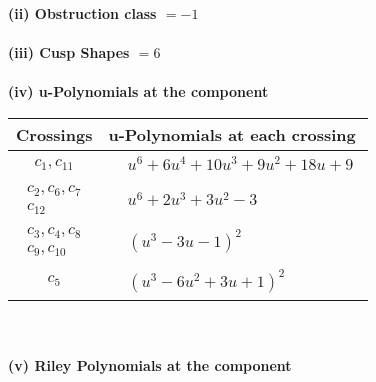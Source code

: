 \documentclass[1p]{elsarticle_modified}
\theoremstyle{definition}
\begin{document}
\flushleft \textbf{(ii) Obstruction class $= -1$}\\~\\
\flushleft \textbf{(iii) Cusp Shapes $= 6$}\\~\\
\newpage\renewcommand{\arraystretch}{1}
\flushleft \textbf{(iv) u-Polynomials at the component}\newline \\
\begin{tabular}{m{50pt}|m{274pt}}
Crossings & \hspace{64pt}u-Polynomials at each crossing \\
\hline $$\begin{aligned}c_{1},c_{11}\end{aligned}$$&$\begin{aligned}
&u^6+6 u^4+10 u^3+9 u^2+18 u+9
\end{aligned}$\\
\hline $$\begin{aligned}c_{2},c_{6},c_{7}\\c_{12}\end{aligned}$$&$\begin{aligned}
&u^6+2 u^3+3 u^2-3
\end{aligned}$\\
\hline $$\begin{aligned}c_{3},c_{4},c_{8}\\c_{9},c_{10}\end{aligned}$$&$\begin{aligned}
&(u^3-3 u-1)^2
\end{aligned}$\\
\hline $$\begin{aligned}c_{5}\end{aligned}$$&$\begin{aligned}
&(u^3-6 u^2+3 u+1)^2
\end{aligned}$\\
\hline
\end{tabular}\\~\\
\newpage\renewcommand{\arraystretch}{1}
\flushleft \textbf{(v) Riley Polynomials at the component}\newline \\
\end{document}
